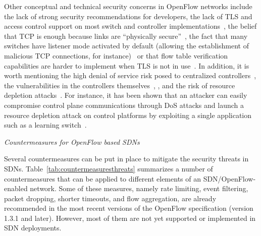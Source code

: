 Other conceptual and technical security concerns in OpenFlow networks include the lack of strong 
security recommendations for developers, the lack of TLS and access control support on most switch and controller 
implementations~\cite{wasserman2013}, the belief that TCP is enough because links are ``physically secure''~\cite{benton2013,wasserman2013}, the fact that many switches have listener 
mode activated by default (allowing the establishment of malicious TCP connections, for instance)~\cite{benton2013} or that flow table verification capabilities are harder to implement when TLS is not 
in use~\cite{wasserman2013,son2013}.
In addition, it is worth mentioning the high denial of service risk posed to centralized controllers~\cite{shin2013,son2013}, the vulnerabilities in the controllers themselves~\cite{son2013,kreutz2013}, , and the risk of resource depletion attacks~\cite{shin2013,benton2013}.
For instance, it has been shown that an attacker can easily compromise control plane communications through 
DoS attacks and launch a resource depletion attack on control platforms by exploiting a single  application such as a learning switch~\cite{benton2013,shin2013}.


\vspace{2mm}
\noindent \textit{Countermeasures for OpenFlow based SDNs}

Several countermeasures can be put in place to mitigate the security threats in SDNs.
Table~\ref{tab:countermeasuresthreats} summarizes a number of countermeasures that can be applied to different 
elements of an SDN/OpenFlow-enabled network. Some of these measures, namely rate limiting, event filtering, 
packet dropping, shorter timeouts, and flow aggregation, are already recommended in the most recent 
versions of the OpenFlow specification (version 1.3.1 and later). 
However, most of them are not yet supported or implemented in SDN deployments.

